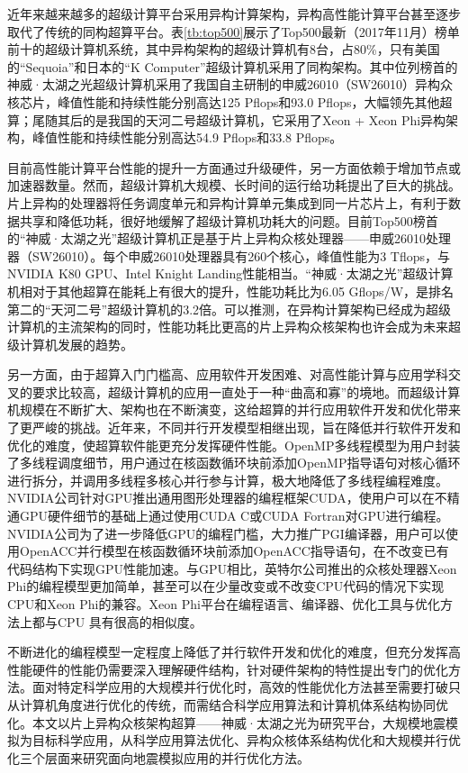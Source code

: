 近年来越来越多的超级计算平台采用异构计算架构\cite{buyya1999high}，异构高性能计算平台甚至逐步取代了传统的同构超算平台。表\ref{tb:top500}展示了Top500最新（2017年11月）榜单前十的超级计算机系统，其中异构架构的超级计算机有8台，占80\%，只有美国的“Sequoia”和日本的“K Computer”超级计算机采用了同构架构。其中位列榜首的神威·太湖之光超级计算机采用了我国自主研制的申威26010（SW26010）异构众核芯片，峰值性能和持续性能分别高达125 Pflops和93.0 Pflops，大幅领先其他超算；尾随其后的是我国的天河二号超级计算机，它采用了Xeon + Xeon Phi异构架构，峰值性能和持续性能分别高达54.9 Pflops和33.8 Pflops。

目前高性能计算平台性能的提升一方面通过升级硬件，另一方面依赖于增加节点或加速器数量。然而，超级计算机大规模、长时间的运行给功耗提出了巨大的挑战\cite{reed2015exascale}。片上异构的处理器将任务调度单元和异构计算单元集成到同一片芯片上，有利于数据共享和降低功耗，很好地缓解了超级计算机功耗大的问题。目前Top500榜首的“神威·太湖之光”超级计算机正是基于片上异构众核处理器\cite{fu2016sunway}——申威26010处理器（SW26010）。每个申威26010处理器具有260个核心，峰值性能为3 Tflops，与NVIDIA K80 GPU、Intel Knight Landing性能相当\cite{einkemmer2017evaluation,sodani2016knights}。“神威·太湖之光”超级计算机相对于其他超算在能耗上有很大的提升，性能功耗比为6.05 Gflops/W，是排名第二的“天河二号”超级计算机的3.2倍。可以推测，在异构计算架构已经成为超级计算机的主流架构的同时，性能功耗比更高的片上异构众核架构也许会成为未来超级计算机发展的趋势。

另一方面，由于超算入门门槛高、应用软件开发困难、对高性能计算与应用学科交叉的要求比较高，超级计算机的应用一直处于一种“曲高和寡”的境地。而超级计算机规模在不断扩大、架构也在不断演变，这给超算的并行应用软件开发和优化带来了更严峻的挑战。近年来，不同并行开发模型相继出现，旨在降低并行软件开发和优化的难度，使超算软件能更充分发挥硬件性能。OpenMP多线程模型为用户封装了多线程调度细节，用户通过在核函数循环块前添加OpenMP指导语句对核心循环进行拆分，并调用多线程多核心并行参与计算，极大地降低了多线程编程难度。NVIDIA公司针对GPU推出通用图形处理器的编程框架CUDA\cite{cook2012cuda}，使用户可以在不精通GPU硬件细节的基础上通过使用CUDA C或CUDA Fortran对GPU进行编程。NVIDIA公司为了进一步降低GPU的编程门槛，大力推广PGI编译器，用户可以使用OpenACC并行模型在核函数循环块前添加OpenACC指导语句，在不改变已有代码结构下实现GPU性能加速。与GPU相比，英特尔公司推出的众核处理器Xeon Phi的编程模型更加简单，甚至可以在少量改变或不改变CPU代码的情况下实现CPU和Xeon Phi的兼容。Xeon Phi平台在编程语言、编译器、优化工具与优化方法上都与CPU 具有很高的相似度。

不断进化的编程模型一定程度上降低了并行软件开发和优化的难度，但充分发挥高性能硬件的性能仍需要深入理解硬件结构，针对硬件架构的特性提出专门的优化方法。面对特定科学应用的大规模并行优化时，高效的性能优化方法甚至需要打破只从计算机角度进行优化的传统，而需结合科学应用算法和计算机体系结构协同优化。本文以片上异构众核架构超算——神威·太湖之光为研究平台，大规模地震模拟为目标科学应用，从科学应用算法优化、异构众核体系结构优化和大规模并行优化三个层面来研究面向地震模拟应用的并行优化方法。

